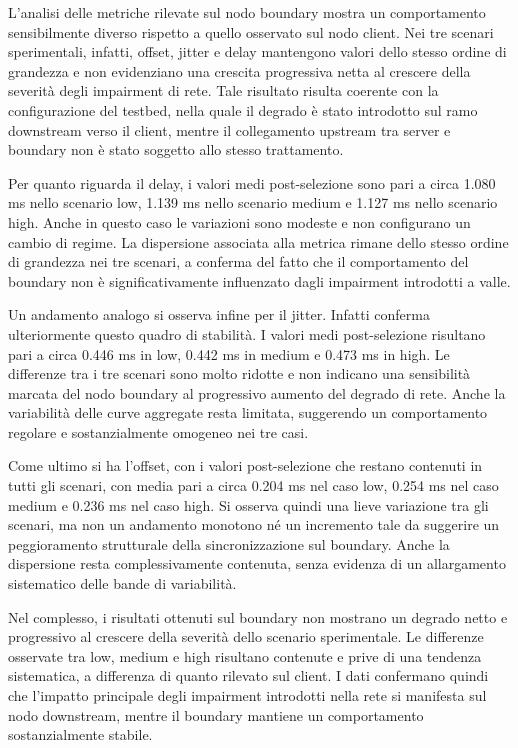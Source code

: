 L’analisi delle metriche rilevate sul nodo boundary mostra un comportamento
sensibilmente diverso rispetto a quello osservato sul nodo client. Nei tre scenari
sperimentali, infatti, offset, jitter e delay mantengono valori dello stesso
ordine di grandezza e non evidenziano una crescita progressiva netta al crescere
della severità degli impairment di rete. Tale risultato risulta coerente con la configurazione
del testbed, nella quale il degrado è stato introdotto sul ramo downstream verso
il client, mentre il collegamento upstream tra server e boundary non è stato soggetto
allo stesso trattamento.

Per quanto riguarda il delay, i valori medi post-selezione sono pari a circa
1.080 ms nello scenario low, 1.139 ms nello scenario medium e 1.127 ms nello scenario
high. Anche in questo caso le variazioni sono modeste e non configurano un
cambio di regime. La dispersione associata alla metrica rimane dello stesso ordine
di grandezza nei tre scenari, a conferma del fatto che il comportamento del
boundary non è significativamente influenzato dagli impairment introdotti a
valle.

Un andamento analogo si osserva infine per il jitter. Infatti conferma ulteriormente
questo quadro di stabilità. I valori medi post-selezione risultano pari a circa
0.446 ms in low, 0.442 ms in medium e 0.473 ms in high. Le differenze tra i tre
scenari sono molto ridotte e non indicano una sensibilità marcata del nodo
boundary al progressivo aumento del degrado di rete. Anche la variabilità delle curve
aggregate resta limitata, suggerendo un comportamento regolare e sostanzialmente
omogeneo nei tre casi.

Come ultimo si ha l’offset, con i valori post-selezione che restano contenuti in tutti
gli scenari, con media pari a circa 0.204 ms nel caso low, 0.254 ms nel caso medium
e 0.236 ms nel caso high. Si osserva quindi una lieve variazione tra gli scenari,
ma non un andamento monotono né un incremento tale da suggerire un peggioramento strutturale
della sincronizzazione sul boundary. Anche la dispersione resta complessivamente
contenuta, senza evidenza di un allargamento sistematico delle bande di variabilità.

Nel complesso, i risultati ottenuti sul boundary non mostrano un degrado netto e
progressivo al crescere della severità dello scenario sperimentale. Le differenze
osservate tra low, medium e high risultano contenute e prive di una tendenza
sistematica, a differenza di quanto rilevato sul client. I dati confermano
quindi che l’impatto principale degli impairment introdotti nella rete si
manifesta sul nodo downstream, mentre il boundary mantiene un comportamento sostanzialmente
stabile.

